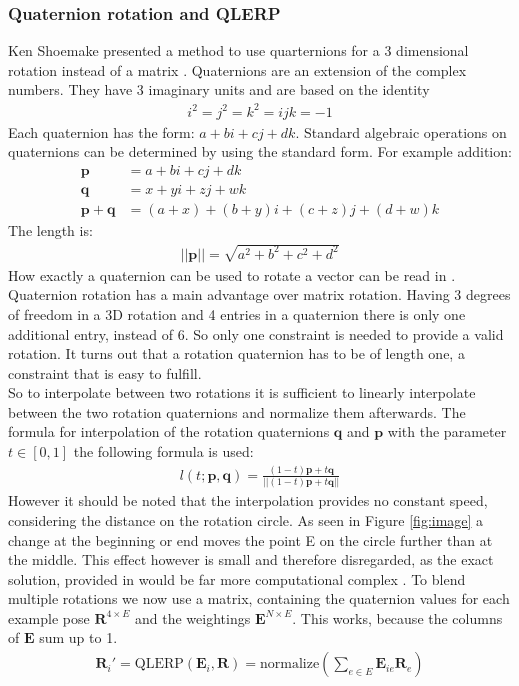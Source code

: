 \documentclass[
	11pt, 
	DIV10,
	a4paper, 
	oneside, 
	headings=normal, 
	captions=tableheading,
	final, 
	numbers=noenddot
]{scrartcl}
\begin{document}
\subsubsection{Quaternion rotation and QLERP}
Ken Shoemake presented a method to use quarternions for a 3 dimensional rotation instead of a matrix \cite{Quat}.
Quaternions are an extension of the complex numbers. They have 3 imaginary units and are based on the identity
\begin{align}
i^2=j^2=k^2=ijk=-1
\end{align}
Each quaternion has the form: $a+ bi+cj+dk$.
Standard algebraic operations on quaternions can be determined by using the standard form. For example addition:
\begin{align}
\bm p &= a+ bi+cj+dk\\
\bm q &= x+ yi + zj+wk\\
\bm p+ \bm q &= (a+ x) + (b+y)i + (c+z)j + (d+w)k
\end{align}
The length is:
\begin{align}
||\bm p|| = \sqrt{a^2+b^2+c^2+d^2}
\end{align}
How exactly a quaternion can be used to rotate a vector can be read in \cite{Quat}.\\
Quaternion rotation has a main advantage over matrix rotation. Having 3 degrees of freedom in a 3D rotation and 4 entries in a quaternion there is only one additional entry, instead of 6. So only one constraint is needed to provide a valid rotation. It turns out that a rotation quaternion has to be of length one, a constraint that is easy to fulfill.\\
So to interpolate between two rotations it is sufficient to linearly interpolate between the two rotation quaternions and normalize them afterwards. \cite{QLERP}
The formula for interpolation of the rotation quaternions $\bm q$ and $\bm p$ with the parameter $t \in[0,1]$ the following formula is used:
\begin{align}
l(t;\bm{p},\bm{q}) = \frac{(1-t)\bm{p} + t\bm{q}}{||(1-t)\bm{p} + t\bm{q}||}
\end{align}
However it should be noted that the interpolation provides no constant speed, considering the distance on the rotation circle. As seen in Figure \ref{fig:image} a change at the beginning or end moves the point E on the circle further than at the middle. This effect however is small and therefore disregarded, as the exact solution, provided in \cite{Quat} would be far more computational complex \cite{QLERP}.
To blend multiple rotations we now use a matrix, containing the quaternion values for each example pose $\bm{R}^{4\times E}$ and the weightings $\bm{E}^{N\times E}$. This works, because the columns of $\bm{E}$ sum up to 1.
\begin{align}
\bm{R}_i' =\text{QLERP} (\bm{E}_i,\bm{R}) = \text{normalize} \left( \sum_{e\in E} \bm{E}_{ie} \bm{R}_{e}\right)
\end{align}
\end{document}
